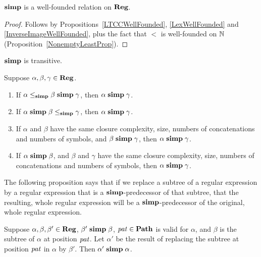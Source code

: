 \begin{proposition}
\label{SimpWF}
$\mathrel{\mathbf{simp}}$ is a well-founded relation on $\mathbf{Reg}$.
\end{proposition}

\begin{proof}
Follows by Propositions~\ref{LTCCWellFounded}, \ref{LexWellFounded}
and \ref{InverseImageWellFounded}, plus the fact that $<$ is
well-founded on $\mathbb{N}$ (Proposition~\ref{NonemptyLeastProp}).
\end{proof}

\begin{proposition}
\label{SimpTrans}
$\mathrel{\mathbf{simp}}$ is transitive.
\end{proposition}

\begin{proposition}
\label{SimpTransLEQSimp}
Suppose $\alpha, \beta, \gamma\in\mathbf{Reg}$.

\begin{enumerate}[\quad(1)]
\item If $\alpha\mathrel{\leq_{\mathbf{simp}}}\beta\mathrel{\mathbf{simp}}\gamma$, then $\alpha\mathrel{\mathbf{simp}}\gamma$.
  
\item If $\alpha\mathrel{\mathbf{simp}}\beta\mathrel{\leq_{\mathbf{simp}}}\gamma$, then $\alpha\mathrel{\mathbf{simp}}\gamma$.

\item If $\alpha$ and $\beta$ have the same closure complexity, size,
  numbers of concatenations and numbers of symbols, and $\beta\mathrel{\mathbf{simp}}\gamma$,
  then $\alpha\mathrel{\mathbf{simp}}\gamma$.

\item If $\alpha\mathrel{\mathbf{simp}}\beta$, and $\beta$ and $\gamma$ have the same
  closure complexity, size, numbers of concatenations and numbers of
  symbols, then $\alpha\mathrel{\mathbf{simp}}\gamma$.
\end{enumerate}
\end{proposition}

The following proposition says that if we replace a subtree of a
regular expression by a regular expression that is a
$\mathrel{\mathbf{simp}}$-predecessor of that subtree, that the resulting, whole regular
expression will be a $\mathrel{\mathbf{simp}}$-predecessor of the original, whole
regular expression.

\begin{proposition}
\label{RegSimpSubtreeSubstitute}

Suppose $\alpha,\beta,\beta'\in\mathbf{Reg}$, $\beta'\mathrel{\mathbf{simp}}\beta$,
${\it pat}\in\mathbf{Path}$ is valid for $\alpha$, and $\beta$ is
the subtree of $\alpha$ at position ${\it pat}$.
Let $\alpha'$ be the result of replacing the subtree at
position ${\it pat}$ in $\alpha$ by $\beta'$. Then $\alpha'\mathrel{\mathbf{simp}}\alpha$.
\end{proposition}


